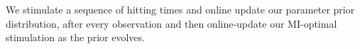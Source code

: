 % 
% 
% 
% 
We stimulate a sequence
of hitting times and online update our parameter prior distribution, after
every observation and then online-update our MI-optimal stimulation as the
prior evolves. 

